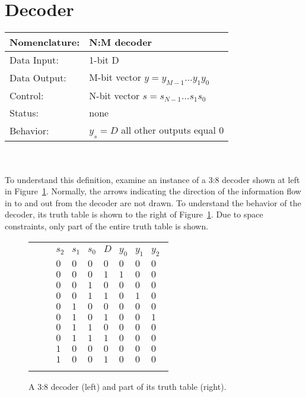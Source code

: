 \section{Decoder}
\begin{tabular}{|l|p{3.5in}|} \hline
Nomenclature:  & N:M decoder				\\ \hline
Data Input:    & 1-bit D		\\ \hline
Data Output:   & M-bit vector $y = y_{M-1} \ldots y_1 y_0$	\\ \hline
Control:       & N-bit vector $s = s_{N-1} \ldots s_1 s_0$	\\ \hline
Status:        & none					\\ \hline
Behavior:      & $y_s = D$ all other outputs equal 0	\\ \hline
\end{tabular}
\label{page:dec}
\\ \\
To understand this definition, examine an
instance of a 3:8 decoder shown at left in Figure~\ref{fig:comboBB3:8}.
Normally, the arrows indicating the direction of the information 
flow in to and out from the decoder are not drawn.  
To understand the behavior of the decoder, its
truth table is shown to the right of Figure~\ref{fig:comboBB3:8}. 
Due to space constraints, only part of the entire truth
table is shown.

\begin{figure}[ht]
\begin{tabular}[b]{p{1.0in}p{0.5in}l}
\includegraphics[0mm,20mm][12mm,12mm]{3_8} & &
$\begin{array}{c|c|c|c||c|c|c}
s_2 & s_1 & s_0 & D & y_0 & y_1 & y_2\\ \hline
0 & 0 & 0 & 0 	& 0  &   0 &   0\\ \hline
0 & 0 & 0 & 1 	& 1  &   0 &   0\\ \hline
0 & 0 & 1 & 0 	& 0  &   0 &   0\\ \hline
0 & 0 & 1 & 1 	& 0  &   1 &   0\\ \hline
0 & 1 & 0 & 0 	& 0  &   0 &   0\\ \hline
0 & 1 & 0 & 1 	& 0  &   0 &   1\\ \hline
0 & 1 & 1 & 0 	& 0  &   0 &   0\\ \hline
0 & 1 & 1 & 1 	& 0  &   0 &   0\\ \hline
1 & 0 & 0 & 0 	& 0  &   0 &   0\\ \hline
1 & 0 & 0 & 1 	& 0  &   0 &   0\\
\end{array}$ \\
\end{tabular}
\caption{A 3:8 decoder (left) and part of its truth table (right).}
\label{fig:comboBB3:8}
\end{figure}

